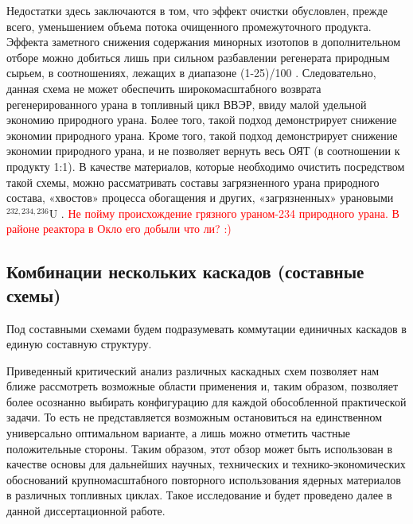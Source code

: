 Недостатки здесь заключаются в том, что эффект очистки обусловлен, прежде всего, уменьшением объема потока очищенного промежуточного продукта. Эффекта заметного снижения содержания минорных изотопов в дополнительном отборе можно добиться лишь при сильном разбавлении регенерата природным сырьем, в соотношениях, лежащих в диапазоне (1-25)/100 \cite{palkinSeparationUraniumIsotopes2010, smirnovKaskadnyeShemyZadachah2012}. Следовательно, данная схема не может обеспечить широкомасштабного возврата регенерированного урана в топливный цикл ВВЭР, ввиду малой удельной экономию природного урана.  Более того, такой подход демонстрирует снижение экономии природного урана. Кроме того, такой подход демонстрирует снижение экономии природного урана, и не позволяет вернуть весь ОЯТ (в соотношении к продукту 1:1).
В качестве материалов, которые необходимо очистить посредством такой схемы, можно рассматривать составы загрязненного урана природного состава, «хвостов» процесса обогащения и других, «загрязненных» урановыми $^{232,234,236}$U \cite{palkinSeparationUraniumIsotopes2010}. 
\textcolor{red}{Не пойму происхождение грязного ураном-234 природного урана. В районе реактора в Окло его добыли что ли? :)}

\subsection{Комбинации нескольких каскадов (составные схемы)}\label{sec:ch1/sec2.3}
Под составными схемами будем подразумевать коммутации единичных каскадов в единую составную структуру.

Приведенный критический анализ различных каскадных схем позволяет нам ближе рассмотреть возможные области применения и, таким образом, позволяет более осознанно выбирать конфигурацию для каждой обособленной практической задачи. То есть не представляется возможным остановиться на единственном универсально оптимальном варианте, а лишь можно отметить частные положительные стороны. Таким образом, этот обзор может быть использован в качестве основы для дальнейших научных, технических и технико-экономических обоснований крупномасштабного повторного использования ядерных материалов в различных топливных циклах. Такое исследование и будет проведено далее в данной диссертационной работе.

